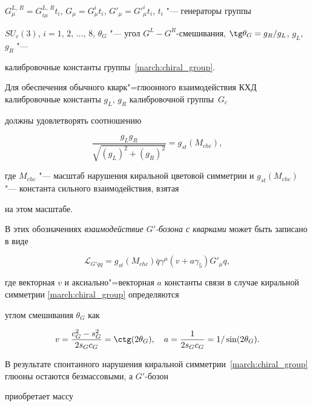 $G^{L,\,R}_{\mu} = G^{L,\,R}_{i\mu} t_i$, $G_{\mu} = G^i_{\mu} t_i$, $G'_{\mu} = G'^i_{\mu} t_i$, $t_i$ "--- генераторы группы

$SU_c(3)$, \mbox{$i=1,\,2,\,\ldots,\,8$,} $\theta_G$ "--- угол $G^{L}{-}G^{R}$-смешивания, $\tg \theta_G=g_R/g_L$, $g_L$, $g_R$ "---

калибровочные константы группы~\eqref{march:chiral_group}.



Для обеспечения обычного кварк"=глюонного взаимодействия КХД калибровочные константы $g_L$, $g_R$ калибровочной группы~$G_c$

должны удовлетворять соотношению

\begin{equation}

\frac{g_L g_R}{\sqrt{(g_L)^2+(g_R)^2}} = g_{st}(M_{chc}), \label{march:eq:gLgRgst}

\end{equation}

где $M_{chc}$ "--- масштаб нарушения киральной цветовой симметрии и $g_{st}(M_{chc})$ "--- константа сильного взаимодействия, взятая

на этом масштабе.



В этих обозначениях  \textit{взаимодействие  $G'$-бозона с кварками} может быть записано в виде

\begin{equation}

\mathcal{L}_{G'qq}=g_{st}(M_{chc}) \bar{q} \gamma^\mu (v + a \gamma_5) G'_\mu q , \label{march:eg:LG1qq}

\end{equation}

где векторная $v$ и аксиально"=векторная $a$ константы связи в случае киральной симметрии \eqref{march:chiral_group} определяются

углом смешивания $\theta_G$ как

\begin{equation}

v = \frac{c_G^2-s_G^2}{2 s_G c_G} = \ctg(2\theta_G), \quad a = \frac{1}{2 s_G c_G} = 1 / \sin(2\theta_G) . \label{march:eg:va}

\end{equation}

В результате спонтанного нарушения киральной симметрии~\eqref{march:chiral_group} глюоны остаются безмассовыми, а $G'$-бозон

приобретает массу

